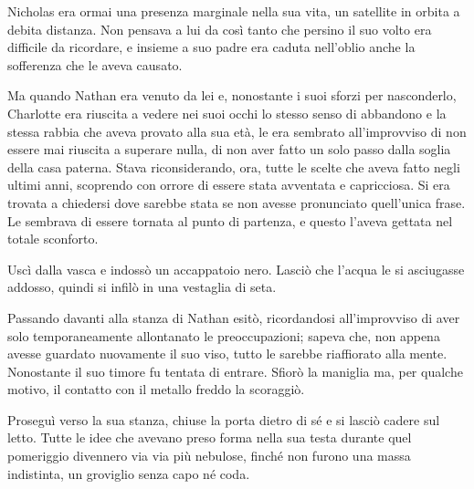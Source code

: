 Nicholas era ormai una presenza marginale nella sua vita, un satellite in orbita a debita distanza.
Non pensava a lui da così tanto che persino il suo volto era difficile da ricordare, e insieme a suo
padre era caduta nell'oblio anche la sofferenza che le aveva causato.

Ma quando Nathan era venuto da lei e, nonostante i suoi sforzi per nasconderlo, Charlotte era
riuscita a vedere nei suoi occhi lo stesso senso di abbandono e la stessa rabbia che aveva provato
alla sua età, le era sembrato all'improvviso di non essere mai riuscita a superare nulla, di non
aver fatto un solo passo dalla soglia della casa paterna. Stava riconsiderando, ora, tutte le scelte
che aveva fatto negli ultimi anni, scoprendo con orrore di essere stata avventata e capricciosa. Si
era trovata a chiedersi dove sarebbe stata se non avesse pronunciato quell'unica frase. Le sembrava
di essere tornata al punto di partenza, e questo l'aveva gettata nel totale sconforto.

Uscì dalla vasca e indossò un accappatoio nero. Lasciò che l'acqua le si asciugasse addosso, quindi
si infilò in una vestaglia di seta.

Passando davanti alla stanza di Nathan esitò, ricordandosi all'improvviso di aver solo
temporaneamente allontanato le preoccupazioni; sapeva che, non appena avesse guardato nuovamente il
suo viso, tutto le sarebbe riaffiorato alla mente. Nonostante il suo timore fu tentata di entrare.
Sfiorò la maniglia ma, per qualche motivo, il contatto con il metallo freddo la scoraggiò.

Proseguì verso la sua stanza, chiuse la porta dietro di sé e si lasciò cadere sul letto. Tutte le
idee che avevano preso forma nella sua testa durante quel pomeriggio divennero via via più nebulose,
finché non furono una massa indistinta, un groviglio senza capo né coda.
